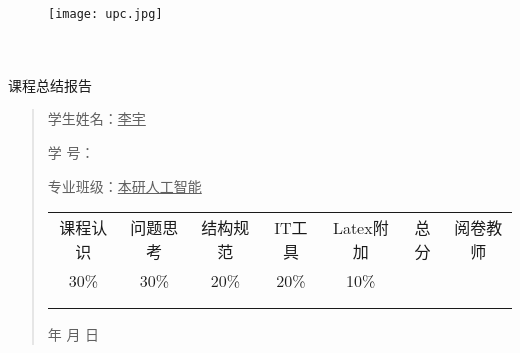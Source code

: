 \documentclass{article}
\renewcommand{\today}{\number\year 年 \number\month 月 \number\day 日}
\begin{document}
\begin{figure}
    \centering
    \texttt{[image: upc.jpg]}

    \label{figupc}
\end{figure}

	\begin{center}
		\quad \\
		\quad \\
		\heiti \fontsize{45}{17} \quad \quad \quad 
		\vskip 1.5cm
		\heiti {} 课程总结报告
	\end{center}
	\vskip 3.0cm
		
	\begin{quotation}

		\doublespacing
		
        \par\setlength\parindent{7em}
		\quad 


		学生姓名：\underline{\qquad  李宇 \qquad}

		学\hspace{0.61cm} 号：\underline{\qquad}
		
		专业班级：\underline{\qquad 本研人工智能 \qquad  }

		\vskip 3cm
		\centering
		\begin{table}[h]
			\centering 
			\begin{tabular}{|c|c|c|c|c|c|c|}
				\hline
				课程认识 & 问题思考 & 结构规范 & IT工具 & Latex附加 & 总分 & 阅卷教师 \\
				30\% & 30\% & 20\% & 20\% & 10\% &  &  \\
				\hline
				& & & & & &\\
				& & & & & &\\
				\hline
			\end{tabular}
		\end{table}
		\today
	\end{quotation}

\thispagestyle{empty}
\newpage
\setcounter{page}{1}
\end{document}
